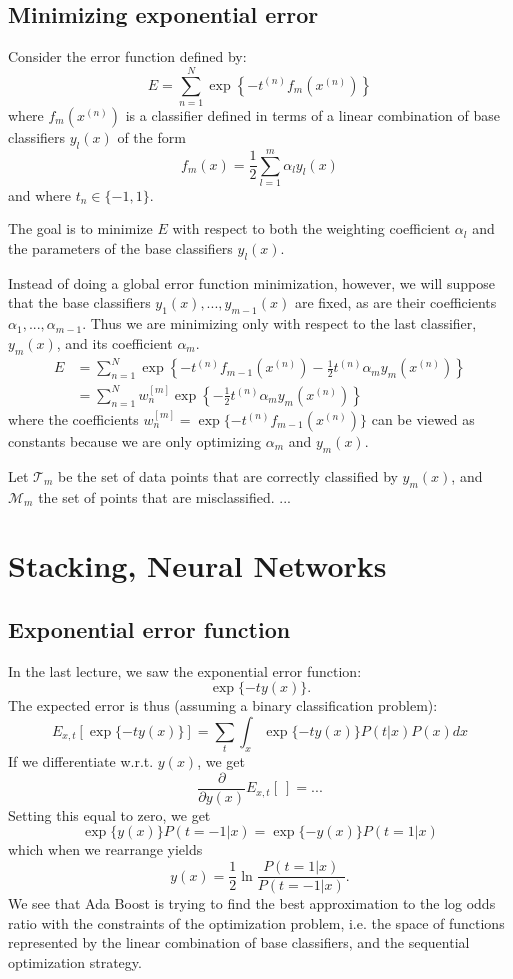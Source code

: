 \documentclass[a4paper,12pt]{article}
\begin{document}
\subsection{Minimizing exponential error}

Consider the error function defined by: 
$$E = \sum_{n=1}^N \exp \left\{-t^{(n)} f_m(x^{(n)})\right\}$$
where $f_m(x^{(n)})$ is a classifier defined in terms of a linear combination of base classifiers $y_l(x)$ of the form 
$$f_m(x) = \frac{1}{2}\sum_{l=1}^m \alpha_l y_l(x)$$
and where $t_n \in \{-1, 1\}$. 

The goal is to minimize $E$ with respect to both the weighting coefficient $\alpha_l$ and the parameters of the base classifiers $y_l(x)$. 

Instead of doing a global error function minimization, however, we will suppose that the base classifiers $y_1(x), ..., y_{m-1}(x)$ are fixed, as are their coefficients $\alpha_1, ..., \alpha_{m-1}$. Thus we are minimizing only with respect to the last classifier, $y_m(x)$, and its coefficient $\alpha_m$. 
\begin{align*}
E &= \sum_{n=1}^N \exp\left\{-t^{(n)} f_{m-1}(x^{(n)}) - \frac{1}{2}t^{(n)}\alpha_m y_m(x^{(n)})\right\} \\
  &= \sum_{n=1}^N w_n^{[m]} \exp \left\{-\frac{1}{2}t^{(n)}\alpha_m y_m(x^{(n)})\right\}
\end{align*}
where the coefficients $w_n^{[m]} = \exp \{-t^{(n)} f_{m-1}(x^{(n)})\}$ can be viewed as constants because we are only optimizing $\alpha_m$ and $y_m(x)$. 

Let $\mathcal{T}_m$ be the set of data points that are correctly classified by $y_m(x)$, and $\mathcal{M}_m$ the set of points that are misclassified. 
...


\clearpage

\section{Stacking, Neural Networks}

\subsection{Exponential error function}

In the last lecture, we saw the exponential error function:
$$\exp\{-t y(x)\}.$$
The expected error is thus (assuming a binary classification problem):
$$E_{x,t}[\exp\{-ty(x)\}] = \sum_t \int_x \exp\{-ty(x)\}P(t|x)P(x)dx$$
If we differentiate w.r.t. $y(x)$, we get
$$\frac{\partial}{\partial y(x)} E_{x,t}[~] = ...$$
Setting this equal to zero, we get 
$$\exp\{y(x)\}P(t=-1|x) = \exp\{-y(x)\}P(t=1|x)$$
which when we rearrange yields
$$y(x) = \frac{1}{2} \ln \frac{P(t=1|x)}{P(t=-1|x)}.$$
We see that Ada Boost is trying to find the best approximation to the log odds ratio with the constraints of the optimization problem, i.e. the space of functions represented by the linear combination of base classifiers, and the sequential optimization strategy. 
\end{document}
